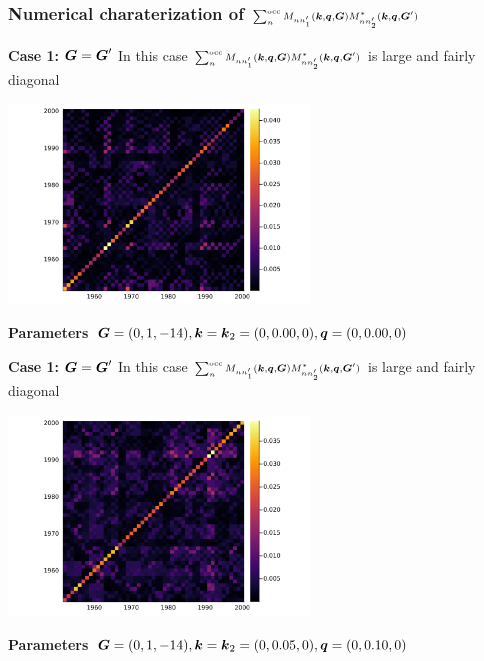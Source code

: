 \documentclass[t]{beamer}
\begin{document}
\begin{frame}[allowframebreaks]
\frametitle{Numerical charaterization of 
$\scriptstyle \sum_{n}^{\text{occ}} M_{n n'_1} (\vb*{k}, \vb*{q}, \vb*{G}) M^*_{nn'_2} (\vb*{k}, \vb*{q}, \vb*{G}') $}

\textbf{Case 1: $\vb*{G} = \vb*{G}'$}  In this case $\scriptstyle \sum_{n}^{\text{occ}} M_{n n'_1} (\vb*{k}, \vb*{q}, \vb*{G}) M^*_{nn'_2} (\vb*{k}, \vb*{q}, \vb*{G}')$ is large and fairly diagonal

\begin{center}
    \includegraphics[width=0.6\textwidth]{../data/chi/nc_range-1951-2000-k_idx-1-q_idx-1-G_idx-810.png}
\end{center}

\textbf{Parameters} $\vb*{G} = (0, 1, -14), \vb*{k} = \vb*{k}_2 = (0, 0.00, 0), \vb*{q} = (0, 0.00, 0)$

\framebreak

\textbf{Case 1: $\vb*{G} = \vb*{G}'$}  In this case $\scriptstyle \sum_{n}^{\text{occ}} M_{n n'_1} (\vb*{k}, \vb*{q}, \vb*{G}) M^*_{nn'_2} (\vb*{k}, \vb*{q}, \vb*{G}')$ is large and fairly diagonal

\begin{center}
    \includegraphics[width=0.6\textwidth]{../data/chi/nc_range-1951-2000-k_idx-2-q_idx-3-G_idx-810.png}
\end{center}

\textbf{Parameters} $\vb*{G} = (0, 1, -14), \vb*{k} = \vb*{k}_2 = (0, 0.05, 0), \vb*{q} = (0, 0.10, 0)$


\end{frame}
\end{document}
